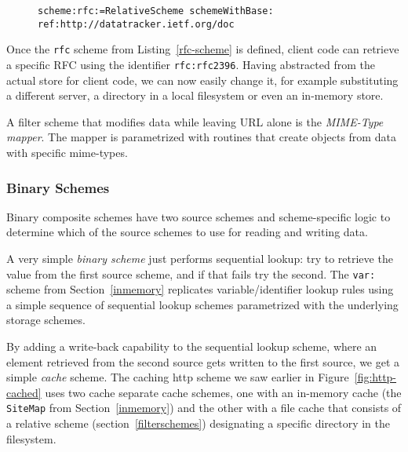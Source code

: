 \documentclass[preprint,authoryear]{llncs}
\begin{document}
\begin{figure}[htbp]
\begin{lstlisting}[style=L,label=rfc-scheme,caption=Defining a custom rfc: scheme.]
scheme:rfc:=RelativeScheme schemeWithBase: ref:http://datatracker.ietf.org/doc
\end{lstlisting}
\end{figure}

Once the {\tt rfc} scheme from Listing~\ref{rfc-scheme} is defined, client code can 
retrieve a specific RFC using the identifier {\tt  rfc:rfc2396}.  Having abstracted
from the actual store for client code, we can now easily change it, for example
substituting a different server, a directory in a local filesystem or even an 
in-memory store.




A filter scheme that modifies data while leaving URL alone is the \emph{MIME-Type mapper}.
The mapper is parametrized with routines that create objects from data with specific
mime-types.  


\subsubsection{Binary Schemes}

Binary composite schemes have two source schemes and scheme-specific logic
to determine which of the source schemes to use for reading and writing data.

A very simple \emph{binary scheme} just performs sequential lookup:  try to
retrieve the value from the first source scheme, and if that fails try the second.
The {\tt var:} scheme from Section~\ref{inmemory}  replicates variable/identifier
lookup rules using a simple sequence of sequential lookup schemes parametrized
with the underlying storage schemes.

By adding a write-back capability to the sequential lookup scheme, where an element
retrieved from the second source gets written to the first source, we get a simple \emph{cache} scheme.  
The caching http scheme we saw earlier in Figure~\ref{fig:http-cached} uses two cache
separate cache schemes, one with an in-memory cache (the {\tt SiteMap} from Section~\ref{inmemory})
and the other with a file cache that consists of a relative scheme (section~\ref{filterschemes}) 
designating a specific directory in the filesystem.
\end{document}
